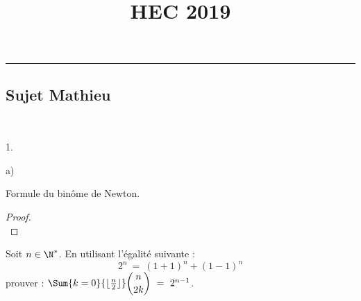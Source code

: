 \documentclass[11pt]{article}%
\title{\bf \vspace{-1.6cm} HEC 2019} %
\author{} %
\date{} %
\begin{document}
\maketitle %
\vspace{-1.2cm}\hrule %
\thispagestyle{fancy}

\vspace*{.2cm}


\subsection*{Sujet Mathieu}

\begin{exerciceAP}~
  \begin{noliste}{1.}
  \item
    \begin{noliste}{a)}
    \item Formule du binôme de Newton.

      \begin{proof}~
        ~\\[-1cm]
      \end{proof}
      
    \item Soit $n \in \N^*$. En utilisant l'égalité suivante :
      \[
        2^n \ = \ (1+1)^n + (1-1)^n
      \]
      prouver : $\Sum{k=0}{\lfloor \frac{n}{2} \rfloor} \dbinom{n}{2k}
      \ = \ 2^{n-1}$.


\end{noliste}
\end{noliste}
\end{exerciceAP}
\end{document}
